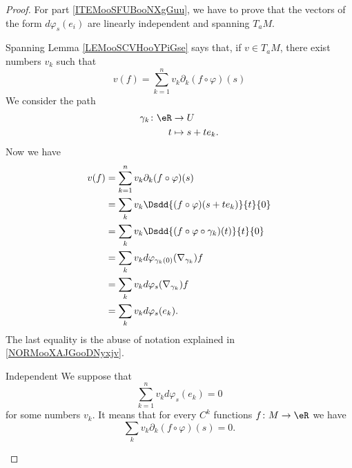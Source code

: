 \begin{proof}
    For part \ref{ITEMooSFUBooNXgGuu}, we have to prove that the vectors of the form \( d\varphi_s(e_i)\) are linearly independent and spanning \( T_aM\).
    \begin{subproof}
        \item[Spanning]
            Lemma \ref{LEMooSCVHooYPiGse} says that, if \( v\in T_aM\), there exist numbers \( v_k\) such that
            \begin{equation}
                v(f)=\sum_{k=1}^nv_k\partial_k(f\circ\varphi)(s)
            \end{equation}
            We consider the path
            \begin{equation}
                \begin{aligned}
                    \gamma_k\colon \eR&\to U \\
                    t&\mapsto s+te_k. 
                \end{aligned}
            \end{equation}
            Now we have
            \begin{subequations}
                \begin{align}
                    v(f)&=\sum_{k=1}^nv_k\partial_k(f\circ\varphi)(s)\\
                    &=\sum_kv_k\Dsdd{ (f\circ\varphi)(s+te_k) }{t}{0}\\
                    &=\sum_kv_k\Dsdd{ (f\circ\varphi\circ\gamma_k)(t) }{t}{0}\\
                    &=\sum_kv_kd\varphi_{\gamma_k(0)}(\nabla_{\gamma_k})f\\
                    &=\sum_kv_kd\varphi_s(\nabla_{\gamma_k})f\\
                    &=\sum_kv_kd\varphi_s(e_k).
                \end{align}
            \end{subequations}
            The last equality is the abuse of notation explained in \ref{NORMooXAJGooDNyxjv}.
        \item[Independent]
            We suppose that
            \begin{equation}
                \sum_{k=1}^nv_kd\varphi_s(e_k)=0
            \end{equation}
            for some numbers \( v_k\). It means that for every \( C^k\) functions \( f\colon M\to \eR\) we have
            \begin{equation}
                \sum_{k}v_k\partial_k(f\circ \varphi)(s)=0.

\end{equation}
\end{subproof}
\end{proof}

